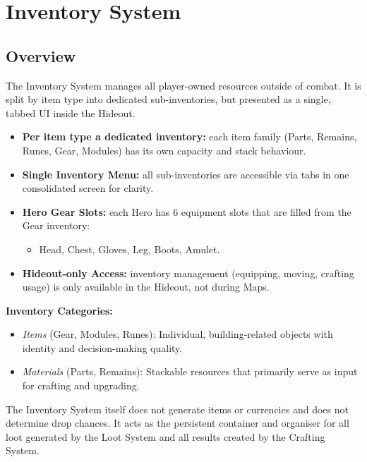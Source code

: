 \section{Inventory System}
\label{sec:inventory-system}

\subsection{Overview}

The Inventory System manages all player-owned resources outside of combat. 
It is split by item type into dedicated sub-inventories, but presented as a single, tabbed UI inside the Hideout.

\begin{itemize}
	\item \textbf{Per item type a dedicated inventory:} each item family (Parts, Remains, Runes, Gear, Modules) has its own capacity and stack behaviour.
	\item \textbf{Single Inventory Menu:} all sub-inventories are accessible via tabs in one consolidated screen for clarity.
	\item \textbf{Hero Gear Slots:} each Hero has 6 equipment slots that are filled from the Gear inventory:
	\begin{itemize}
		\item Head, Chest, Gloves, Leg, Boots, Amulet.
	\end{itemize}
	\item \textbf{Hideout-only Access:} inventory management (equipping, moving, crafting usage) is only available in the Hideout, not during Maps.
\end{itemize}

\textbf{Inventory Categories:}
\begin{itemize}
	\item \emph{Items} (Gear, Modules, Runes): Individual, building-related objects with identity and decision-making quality.
	\item \emph{Materials} (Parts, Remains): Stackable resources that primarily serve as input for crafting and upgrading.
\end{itemize}

The Inventory System itself does not generate items or currencies and does not determine drop chances. 
It acts as the persistent container and organiser for all loot generated by the Loot System and all results created by the Crafting System.


